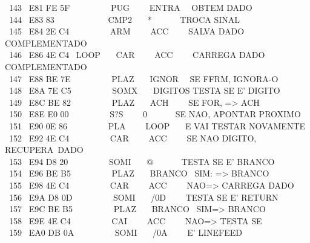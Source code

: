 \documentclass[a4paper,12pt]{article}
\begin{document}
\phantom \ 143 \ E81 FE 5F \ \ \ \ \ \ \ \ \ PUG \ \ \ \ ENTRA \ \ OBTEM DADO\\
\phantom \ 144 \ E83 83 \ \ \ \ \ \ \ \ \ \ \ \ CMP2 \ \ \ * \ \ \ \ \ \ TROCA SINAL\\
\phantom \ 145 \ E84 2E C4 \ \ \ \ \ \ \ \ \ ARM \ \ \ \ ACC \ \ \ \ SALVA DADO COMPLEMENTADO\\
\phantom \ 146 \ E86 4E C4 \ LOOP \ \ \ CAR \ \ \ \ ACC \ \ \ \ CARREGA DADO COMPLEMENTADO\\
\phantom \ 147 \ E88 BE 7E \ \ \ \ \ \ \ \ \ PLAZ \ \ \ IGNOR \ \ SE FFRM, IGNORA-O\\
\phantom \ 148 \ E8A 7E C5 \ \ \ \ \ \ \ \ \ SOMX \ \ \ DIGITOS TESTA SE E' DIGITO\\
\phantom \ 149 \ E8C BE 82 \ \ \ \ \ \ \ \ \ PLAZ \ \ \ ACH \ \ \ \ SE FOR, => ACH\\
\phantom \ 150 \ E8E E0 00 \ \ \ \ \ \ \ \ \ S?S \ \ \ \ 0 \ \ \ \ \ \ SE NAO, APONTAR PROXIMO\\
\phantom \ 151 \ E90 0E 86 \ \ \ \ \ \ \ \ \ PLA \ \ \ \ LOOP \ \ \ E VAI TESTAR NOVAMENTE\\
\phantom \ 152 \ E92 4E C4 \ \ \ \ \ \ \ \ \ CAR \ \ \ \ ACC \ \ \ \ SE NAO DIGITO, RECUPERA\,\,\,DADO\\
\phantom \ 153 \ E94 D8 20 \ \ \ \ \ \ \ \ \ SOMI \ \ \ @ \ \ \ \ \ \ TESTA SE E' BRANCO\\
\phantom \ 154 \ E96 BE B5 \ \ \ \ \ \ \ \ \ PLAZ \ \ \ BRANCO \ SIM: => BRANCO\\
\phantom \ 155 \ E98 4E C4 \ \ \ \ \ \ \ \ \ CAR \ \ \ \ ACC \ \ \ \ NAO=> CARREGA DADO\\
\phantom \ 156 \ E9A D8 0D \ \ \ \ \ \ \ \ \ SOMI \ \ \ /0D \ \ \ \ TESTA SE E' RETURN\\
\phantom \ 157 \ E9C BE B5 \ \ \ \ \ \ \ \ \ PLAZ \ \ \ BRANCO \ SIM=> BRANCO\\
\phantom \ 158 \ E9E 4E C4 \ \ \ \ \ \ \ \ \ CAI \ \ \ \ ACC \ \ \ \ NAO=> TESTA SE\\
\phantom \ 159 \ EA0 DB 0A \ \ \ \ \ \ \ \ \ SOMI \ \ \ /0A \ \ \ \ E' LINEFEED

\newpage

\noindent \\[2em]
\end{document}
